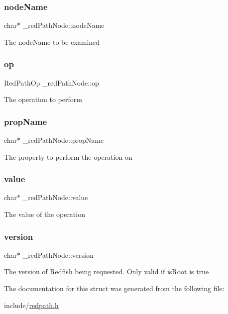 \subsubsection{\texorpdfstring{node\+Name}{nodeName}}
{\footnotesize\ttfamily char$\ast$ \+\_\+red\+Path\+Node\+::node\+Name}

The node\+Name to be examined \mbox{\label{struct__redPathNode_aa21623b64c9fec7341109f52911475b3}} 
\subsubsection{\texorpdfstring{op}{op}}
{\footnotesize\ttfamily Red\+Path\+Op \+\_\+red\+Path\+Node\+::op}

The operation to perform \mbox{\label{struct__redPathNode_ac2ebde308389a766045538cfecfba214}} 
\subsubsection{\texorpdfstring{prop\+Name}{propName}}
{\footnotesize\ttfamily char$\ast$ \+\_\+red\+Path\+Node\+::prop\+Name}

The property to perform the operation on \mbox{\label{struct__redPathNode_a492a339d2938c3354cd3c5cbfcd9075b}} 
\subsubsection{\texorpdfstring{value}{value}}
{\footnotesize\ttfamily char$\ast$ \+\_\+red\+Path\+Node\+::value}

The value of the operation \mbox{\label{struct__redPathNode_aca55747e397ba939a113e611bad76484}} 
\subsubsection{\texorpdfstring{version}{version}}
{\footnotesize\ttfamily char$\ast$ \+\_\+red\+Path\+Node\+::version}

The version of Redfish being requested. Only valid if is\+Root is true 

The documentation for this struct was generated from the following file\+:\begin{DoxyCompactItemize}
\item 
include/\hyperlink{redpath_8h}{redpath.\+h}\end{DoxyCompactItemize}
